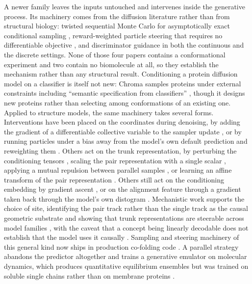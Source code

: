 A newer family leaves the inputs untouched and intervenes inside the generative process. Its
machinery comes from the diffusion literature rather than from structural biology: twisted
sequential Monte Carlo for asymptotically exact conditional sampling \citep{wu2023tds}, reward-weighted
particle steering that requires no differentiable objective \citep{singhal2025fksteering}, and
discriminator guidance in both the continuous \citep{kim2023refining} and the discrete
\citep{ekstromkelvinius2024discriminator} settings. None of those four papers contains a conformational
experiment and two contain no biomolecule at all, so they establish the mechanism rather than any
structural result. Conditioning a protein diffusion model on a classifier is itself not new: Chroma
samples proteins under external constraints including ``semantic specification from classifiers''
\citep[Discussion]{ingraham2023chroma}, though it designs new proteins rather than selecting among
conformations of an existing one. Applied to structure models, the same machinery takes several forms.
Interventions have been placed on the coordinates during denoising, by adding the gradient of a
differentiable collective variable to the sampler update \citep{lam2026metadiffusion}, or by running
particles under a bias away from the model's own default prediction and reweighting them
\citep{richman2025conformix}. Others act on the trunk representation, by perturbing the conditioning
tensors \citep{jung2026boltzperturb}, scaling the pair representation with a single scalar
\citep{suzuki2026pairscaling}, applying a mutual repulsion between parallel samples
\citep{suzuki2026conforflux}, or learning an affine transform of the pair representation
\citep{lee2026confornets}. Others still act on the conditioning embedding by gradient ascent
\citep{li2026embedding}, or on the alignment feature through a gradient taken back through the model's
own distogram \citep{tang2026steeraf}. Mechanistic work supports the choice of site, identifying the pair
track rather than the single track as the causal geometric substrate \citep{feldman2026alphainterp} and
showing that trunk representations are steerable across model families \citep{lu2026twostages}, with the
caveat that a concept being linearly decodable does not establish that the model uses it causally
\citep{jedryszek2026probing}. Sampling and steering machinery of this general kind now ships in
production co-folding code \citep{wohlwend2024boltz1,passaro2025boltz2}. A parallel strategy abandons
the predictor altogether and trains a generative emulator on molecular dynamics, which produces
quantitative equilibrium ensembles but was trained on soluble single chains rather than on membrane
proteins \citep{lewis2025bioemu}.


